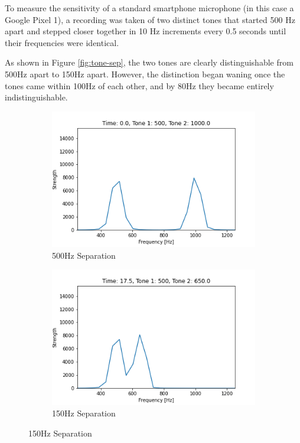 To measure the sensitivity of a standard smartphone microphone (in this case a Google Pixel 1), a recording was taken of two distinct tones that started 500 Hz apart and stepped closer together in 10 Hz increments every 0.5 seconds until their frequencies were identical.

As shown in Figure \ref{fig:tone-sep}, the two tones are clearly distinguishable from 500Hz apart to 150Hz apart.
However, the distinction began waning once the tones came within 100Hz of each other, and by 80Hz they became entirely indistinguishable.

\begin{figure}[h]
    \centering
    \caption{Distinctiveness of Two Increasingly Similar Tones}
    \label{fig:tone-sep}
    \begin{subfigure}{0.5\textwidth}
        \centering
        \caption{500Hz Separation}
        \label{fig:tone-sep-500}
        \includegraphics[width=.90\linewidth]{Figures/4 Protocol Design/Tone Distinctiveness/0.06.png}
        \vspace*{2mm}
    \end{subfigure}%
    \begin{subfigure}{0.5\textwidth}
        \centering
        \caption{150Hz Separation}
        \label{fig:tone-sep-150}
        \includegraphics[width=.90\linewidth]{Figures/4 Protocol Design/Tone Distinctiveness/17.53.png}

\end{subfigure}
\end{figure}
